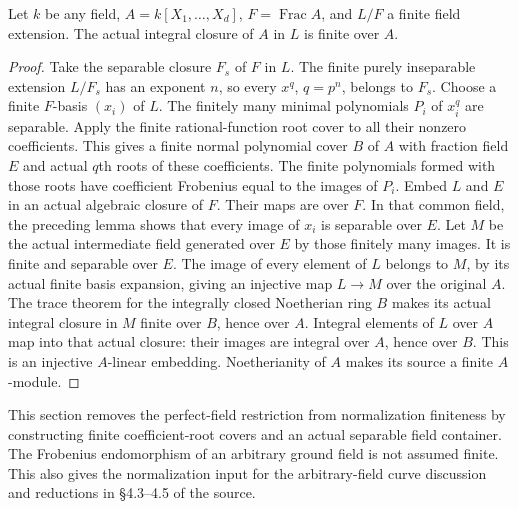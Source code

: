 \begin{theorem}
\label{thm:normalization-finite-polynomial-arbitrary-field}
\leanok
Let $k$ be any field, $A=k[X_1,\ldots,X_d]$, $F=\operatorname{Frac}A$,
and $L/F$ a finite field extension. The actual integral closure of $A$
in $L$ is finite over $A$.
\end{theorem}
\begin{proof}
Take the separable closure $F_s$ of $F$ in $L$. The finite purely
inseparable extension $L/F_s$ has an exponent $n$, so every $x^q$,
$q=p^n$, belongs to $F_s$. Choose a finite $F$-basis $(x_i)$ of $L$.
The finitely many minimal polynomials $P_i$ of $x_i^q$ are separable.
Apply the finite rational-function root cover to all their nonzero
coefficients. This gives a finite normal polynomial cover $B$ of $A$
with fraction field $E$ and actual $q$th roots of these coefficients.
The finite polynomials formed with those roots have coefficient
Frobenius equal to the images of $P_i$.
Embed $L$ and $E$ in an actual algebraic closure of $F$. Their maps
are over $F$. In that common field, the preceding lemma shows that
every image of $x_i$ is separable over $E$. Let $M$ be the actual
intermediate field generated over $E$ by those finitely many images.
It is finite and separable over $E$. The image of every element of
$L$ belongs to $M$, by its actual finite basis expansion, giving an
injective map $L\to M$ over the original $A$.
The trace theorem for the integrally closed Noetherian ring $B$
makes its actual integral closure in $M$ finite over $B$, hence over
$A$. Integral elements of $L$ over $A$ map into that actual closure:
their images are integral over $A$, hence over $B$. This is an
injective $A$-linear embedding. Noetherianity of $A$ makes its source
a finite $A$-module.
\end{proof}

\endgroup

\begingroup

This section removes the perfect-field restriction from normalization
finiteness by constructing finite coefficient-root covers and an actual
separable field container. The Frobenius endomorphism of an arbitrary
ground field is not assumed finite. This also gives the normalization
input for the arbitrary-field curve discussion and reductions in
\S4.3--4.5 of the source.

